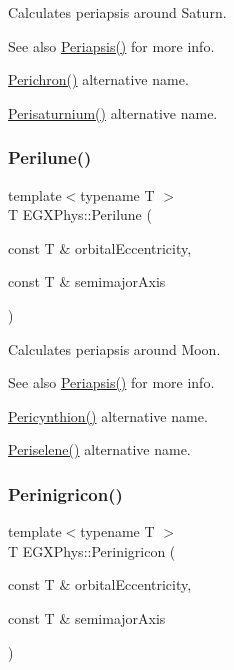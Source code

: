 Calculates periapsis around Saturn. 

\begin{DoxySeeAlso}{See also}
\hyperlink{group___astrophysics_ga4414ac75539371ec874a3d25cad6c9fe}{Periapsis()} for more info. 

\hyperlink{group___astrophysics_ga12b5e99aa2e3e7031ef6ce93060cf516}{Perichron()} alternative name. 

\hyperlink{group___astrophysics_ga60a50d09d29ebe47cbbfc125c2ea42bf}{Perisaturnium()} alternative name. 
\end{DoxySeeAlso}
\mbox{\label{group___astrophysics_ga2cc7ab05e18d32c94d8d74972e032793}} 
\subsubsection{\texorpdfstring{Perilune()}{Perilune()}}
{\footnotesize\ttfamily template$<$typename T $>$ \\
T E\+G\+X\+Phys\+::\+Perilune (\begin{DoxyParamCaption}\item[{const T \&}]{orbital\+Eccentricity,  }\item[{const T \&}]{semimajor\+Axis }\end{DoxyParamCaption})}



Calculates periapsis around Moon. 

\begin{DoxySeeAlso}{See also}
\hyperlink{group___astrophysics_ga4414ac75539371ec874a3d25cad6c9fe}{Periapsis()} for more info. 

\hyperlink{group___astrophysics_gaeeba153b188cd06cbd233eaef12f0a6a}{Pericynthion()} alternative name. 

\hyperlink{group___astrophysics_ga255874374dde571531e443cdbef9ef0c}{Periselene()} alternative name. 
\end{DoxySeeAlso}
\mbox{\label{group___astrophysics_ga99d86af90179994e17158b082c502fd4}} 
\subsubsection{\texorpdfstring{Perinigricon()}{Perinigricon()}}
{\footnotesize\ttfamily template$<$typename T $>$ \\
T E\+G\+X\+Phys\+::\+Perinigricon (\begin{DoxyParamCaption}\item[{const T \&}]{orbital\+Eccentricity,  }\item[{const T \&}]{semimajor\+Axis }\end{DoxyParamCaption})}



